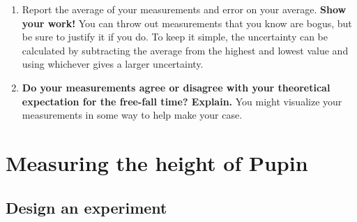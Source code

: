 \documentclass[11pt]{article}%
\newcommand{\SPACE}{\vspace{6em}}
\begin{document}
\begin{enumerate}
\newpage
\item Report the average of your measurements and error on your average. \textbf{Show your work!} You can throw out measurements that you know are bogus, but be sure to justify it if you do. To keep it simple, the uncertainty can be calculated by subtracting the average from the highest and lowest value and using whichever gives a larger uncertainty.
\SPACE
\SPACE

\item \textbf{Do your measurements agree or disagree with your theoretical expectation for the free-fall time? Explain.} You might visualize your measurements in some way to help make your case.
\SPACE



\end{enumerate}

\section{Measuring the height of Pupin}


\subsection{Design an experiment}
\end{document}
